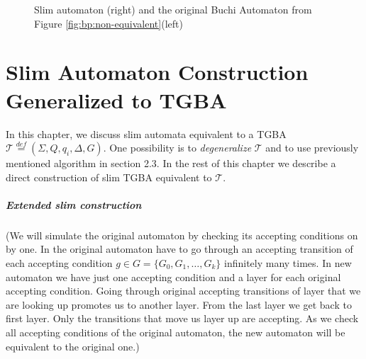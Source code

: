 \documentclass[
	digital
nolof, nolot
]{fithesis3}
\newcommand{\cT}{\mathcal{T}}
\newcommand{\eqdef}{\overset{def}{=}}
\newcommand{\flushed}{\text{\emoji{flushed}}}
\newcommand{\hell}{\text{\emoji{fire}}}
\newcommand{\heaven}{\text{\emoji{innocent}}}
\begin{document}
			\begin{figure}[ht]
				\begin{center}
				\end{center}
				\caption{Slim automaton (right) and the original Buchi Automaton from Figure \ref{fig:bp:non-equivalent}(left)}
				\label{fig:slim:equivalent}
			\end{figure}

			
			\chapter{Slim Automaton Construction Generalized to TGBA}
			In this chapter, we discuss slim automata equivalent to a TGBA $\cT\eqdef(\Sigma, Q, q_i, \Delta, G)$.
			One possibility is to \emph{degeneralize} $\cT$ and to use previously mentioned algorithm in section 2.3.
			In the rest of this chapter we describe a direct construction of slim TGBA equivalent to $\cT$.
			\paragraph{Extended slim construction}
			(We will simulate the original automaton by checking its accepting conditions on by one. In the original automaton have to go through an accepting transition of each accepting condition $g \in G=\{G_0, G_1, \ldots, G_k\}$ infinitely many times. In new automaton we have just one accepting condition and a layer for each original accepting condition. Going through original accepting transitions of layer that we are looking up promotes us to another layer. From the last layer we get back to first layer. Only the transitions that move us layer up are accepting. As we check all accepting conditions of the original automaton, the new automaton will be equivalent to the original one.)
			
\end{document}
